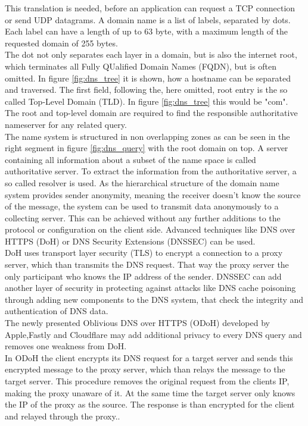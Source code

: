         This translation is needed, before an application can request a TCP connection or send UDP datagrams. A domain name is a list of labels, separated by dots. 
        Each label can have a length of up to 63 byte, with a maximum length of the requested domain of 255 bytes\cite{stevens_tcpip_1993}.\\
        The dot not only separates each layer in a domain, but is also the internet root, which terminates all Fully QUalified Domain Names (FQDN), but is often omitted\cite{jeftovic_managing_2018}.
        In figure \ref{fig:dns_tree} it is shown, how a hostname can be separated and traversed.
        The first field, following the, here omitted, root entry is the so called Top-Level Domain (TLD). In figure \ref{fig:dns_tree} this would be "com". The root and top-level domain are required to find the responsible authoritative nameserver for any related query\cite{jeftovic_managing_2018}.\\
        

        The name system is structured in non overlapping zones as can be seen in the right segment in figure \ref{fig:dns_query} with the root domain on top\cite{herrmann_beobachtungsmoglichkeiten_2016}.
        A server containing all information about a subset of the name space is called authoritative server. To extract the information from the authoritative server, a so called resolver is used\cite{friedewald_privacy_2018}.
        As the hierarchical structure of the domain name system provides sender anonymity, meaning the receiver doesn't know the source of the message, the system can be used to transmit data anonymously to a collecting server. This can be achieved without any further additions to the protocol or configuration on the client side.
        Advanced techniques like DNS over HTTPS (DoH)\cite{ermert_cloudflare_2020}\cite{mcmanus_dns_2018} or DNS Security Extensions (DNSSEC)\cite{larson_dns_2005} can be used.\\
        DoH uses transport layer security (TLS) to encrypt a connection to a proxy server, which than transmits the DNS request. That way the proxy server the only participant who knows the IP address of the sender. DNSSEC can add another layer of security in protecting against attacks like DNS cache poisoning through adding new components to the DNS system, that check the integrity and authentication of DNS data.\\
        The newly presented Oblivious DNS over HTTPS (ODoH) developed by Apple,Fastly and Cloudflare may add additional privacy to every DNS query and removes one weakness from DoH\cite{verma_improving_2020}.\\
        In ODoH the client encrypts its DNS request for a target server and sends this encrypted message to the proxy server, which than relays the message to the target server. This procedure removes the original request from the clients IP, making the proxy unaware of it.
    At the same time the target server only knows the IP of the proxy as the source. The response is than encrypted for the client and relayed through the proxy.\cite{verma_improving_2020}.
        
